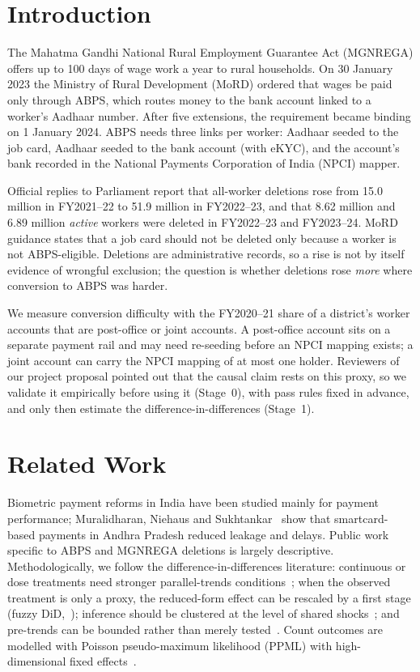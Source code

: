 \documentclass[10pt,twocolumn,letterpaper]{article}
\begin{document}
\section{Introduction}
The Mahatma Gandhi National Rural Employment Guarantee Act (MGNREGA) offers up to 100 days of wage work a year to rural households. On 30 January 2023 the Ministry of Rural Development (MoRD) ordered that wages be paid only through ABPS, which routes money to the bank account linked to a worker's Aadhaar number. After five extensions, the requirement became binding on 1 January 2024. ABPS needs three links per worker: Aadhaar seeded to the job card, Aadhaar seeded to the bank account (with eKYC), and the account's bank recorded in the National Payments Corporation of India (NPCI) mapper.

Official replies to Parliament report that all-worker deletions rose from 15.0 million in FY2021--22 to 51.9 million in FY2022--23, and that 8.62 million and 6.89 million \emph{active} workers were deleted in FY2022--23 and FY2023--24. MoRD guidance states that a job card should not be deleted only because a worker is not ABPS-eligible. Deletions are administrative records, so a rise is not by itself evidence of wrongful exclusion; the question is whether deletions rose \emph{more} where conversion to ABPS was harder.

We measure conversion difficulty with the FY2020--21 share of a district's worker accounts that are post-office or joint accounts. A post-office account sits on a separate payment rail and may need re-seeding before an NPCI mapping exists; a joint account can carry the NPCI mapping of at most one holder. Reviewers of our project proposal pointed out that the causal claim rests on this proxy, so we validate it empirically before using it (Stage~0), with pass rules fixed in advance, and only then estimate the difference-in-differences (Stage~1).

\section{Related Work}
Biometric payment reforms in India have been studied mainly for payment performance; Muralidharan, Niehaus and Sukhtankar~\cite{mns2016} show that smartcard-based payments in Andhra Pradesh reduced leakage and delays. Public work specific to ABPS and MGNREGA deletions is largely descriptive. Methodologically, we follow the difference-in-differences literature: continuous or dose treatments need stronger parallel-trends conditions~\cite{cgs2024}; when the observed treatment is only a proxy, the reduced-form effect can be rescaled by a first stage (fuzzy DiD,~\cite{dcdh2018}); inference should be clustered at the level of shared shocks~\cite{bdm2004}; and pre-trends can be bounded rather than merely tested~\cite{rr2023}. Count outcomes are modelled with Poisson pseudo-maximum likelihood (PPML) with high-dimensional fixed effects~\cite{cgz2020}.
\end{document}
